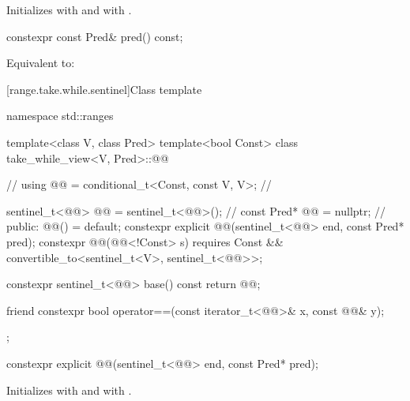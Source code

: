 \begin{itemdescr}
\pnum
\effects
Initializes  with  and
 with .
\end{itemdescr}

%
\begin{itemdecl}
constexpr const Pred& pred() const;
\end{itemdecl}

\begin{itemdescr}
\pnum
\effects
Equivalent to: 
\end{itemdescr}

[range.take.while.sentinel]{Class template }

%
\begin{codeblock}
namespace std::ranges {
  template<class V, class Pred>
  template<bool Const>
  class take_while_view<V, Pred>::@@ {            // \expos
    using @@ = conditional_t<Const, const V, V>;    // \expos

    sentinel_t<@@> @@ = sentinel_t<@@>();     // \expos
    const Pred* @@ = nullptr;                        // \expos
  public:
    @@() = default;
    constexpr explicit @@(sentinel_t<@@> end, const Pred* pred);
    constexpr @@(@@<!Const> s)
      requires Const && convertible_to<sentinel_t<V>, sentinel_t<@@>>;

    constexpr sentinel_t<@@> base() const { return @@; }

    friend constexpr bool operator==(const iterator_t<@@>& x, const @@& y);
  };
}
\end{codeblock}

%
\begin{itemdecl}
constexpr explicit @@(sentinel_t<@@> end, const Pred* pred);
\end{itemdecl}

\begin{itemdescr}
\pnum
\effects
Initializes  with  and  with .
\end{itemdescr}

